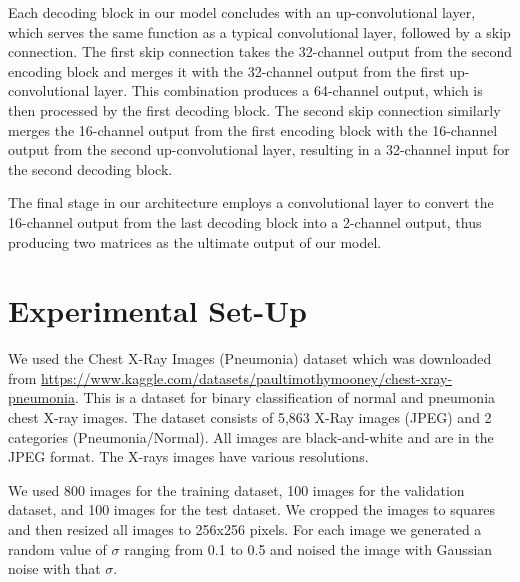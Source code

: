 \documentclass[12pt]{article}
\begin{document}
Each decoding block in our model concludes with an up-convolutional layer, which serves the same function as a typical convolutional layer, followed by a skip connection. The first skip connection takes the 32-channel output from the second encoding block and merges it with the 32-channel output from the first up-convolutional layer. This combination produces a 64-channel output, which is then processed by the first decoding block. The second skip connection similarly merges the 16-channel output from the first encoding block with the 16-channel output from the second up-convolutional layer, resulting in a 32-channel input for the second decoding block.

The final stage in our architecture employs a convolutional layer to convert the 16-channel output from the last decoding block into a 2-channel output, thus producing two matrices as the ultimate output of our model.



\section{Experimental Set-Up}



We used the Chest X-Ray Images (Pneumonia) dataset which was downloaded from \url{https://www.kaggle.com/datasets/paultimothymooney/chest-xray-pneumonia}. This is a dataset for binary classification of normal and pneumonia chest X-ray images. The dataset consists of 5,863 X-Ray images (JPEG) and 2 categories (Pneumonia/Normal).
All images are black-and-white and are in the JPEG format.
The X-rays images have various resolutions.

We used 800 images for the training dataset, 100 images for the validation dataset, and 100 images for the test dataset.
We cropped the images to squares and then resized all images to 256x256 pixels.
For each image we generated a random value of $\sigma$ ranging from 0.1 to 0.5 and noised the image with Gaussian noise with that $\sigma$.

\end{document}
